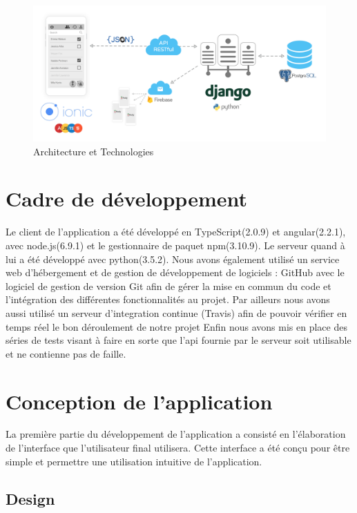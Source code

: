 \documentclass[french]{article}
\begin{document}
		\begin{figure}[H]
			\centering
			\includegraphics[scale=0.35]{../schema/schema-techno.png}
			\caption{Architecture et Technologies}
			\label{Architecture et Technologies}
		\end{figure}
		
	
	\section{Cadre de développement} 
		Le client de l'application a été développé en TypeScript(2.0.9) et angular(2.2.1), avec node.js(6.9.1) et le gestionnaire de paquet npm(3.10.9). Le serveur quand à lui a été développé avec python(3.5.2). 
		Nous avons également utilisé un service web d'hébergement et de gestion de développement de logiciels : GitHub avec le logiciel de gestion de version Git afin de gérer la mise en commun du code et l'intégration des différentes fonctionnalités au projet.
		Par ailleurs nous avons aussi utilisé un serveur d'integration continue (Travis) afin de pouvoir vérifier en temps réel le bon déroulement de notre projet
		Enfin nous avons mis en place des séries de tests visant à faire en sorte que l'api fournie par le serveur soit utilisable et ne contienne pas de faille.
			
	\section{Conception de l'application}
	
	La première partie du développement de l'application a consisté en l'élaboration de l'interface que l'utilisateur final utilisera. Cette interface a été conçu pour être simple et permettre une utilisation intuitive de l'application.
	
	\subsection{Design}
	
\end{document}
